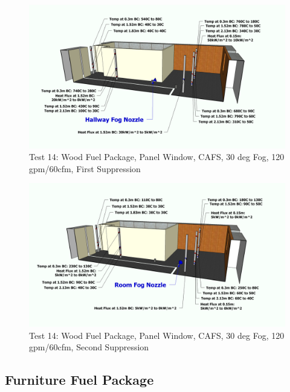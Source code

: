 \documentclass[12pt,oneside]{book}
\begin{document}
\begin{figure}[!ht]
	\includegraphics[width=6in]{../Figures/Pictures/Metric/DelCoFogTest14FirstSuppression}
	\caption{Test 14: Wood Fuel Package, Panel Window, CAFS, 30 deg Fog, 120 gpm/60cfm, First Suppression}
	\label{fig:Test_14_First_Suppression}
\end{figure}

\begin{figure}[!ht]
	\includegraphics[width=6in]{../Figures/Pictures/Metric/DelCoFogTest14SecondSuppression}
	\caption{Test 14: Wood Fuel Package, Panel Window, CAFS, 30 deg Fog, 120 gpm/60cfm, Second Suppression}
	\label{fig:Test_14_Second_Suppression}
\end{figure}

\clearpage

\subsection{Furniture Fuel Package}
\label{subsec:Furniture_Fuel_Package}
\end{document}
